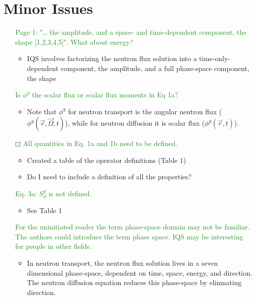 \documentclass{elsarticle}
\newcommand{\working}{$\boxdot$}
\newcommand{\done}{\checkmark}
\newcommand{\easy}[1]{\textcolor{ForestGreen}{#1}}
\begin{document}
\section*{Minor Issues}

\begin{itemize}

\item[\done] \easy{ Page 1: "… the amplitude, and a space- and time-dependent component, the shape [1,2,3,4,5]". What about energy? }
\begin{itemize}
\item IQS involves factorizing the neutron flux solution into a time-only-dependent component, the amplitude, and a full phase-space component, the shape
\end{itemize}

\item[\done] \easy{ Is $\phi^g$ the scalar flux or scalar flux moments in Eq 1a? }
\begin{itemize}
\item Note that $\phi^g$ for neutron transport is the angular neutron flux ($\phi^g(\vec r, \vec\Omega, t)$), while for neutron diffusion it is scalar flux ($\phi^g(\vec r, t)$).
\end{itemize}

\item[\working] \easy{ All quantities in Eq. 1a and 1b need to be defined. }
\begin{itemize}
\item Created a table of the operator definitions (Table 1)
\item Do I need to include a definition of all the properties?
\end{itemize}

\item[\done] \easy{ Eq. 3a: $S_d^g$ is not defined. }
\begin{itemize}
\item See Table 1
\end{itemize}

\item[\done] \easy{ For the uninitiated reader the term phase-space domain may not be familiar. The authors could introduce the term phase space. IQS may be interesting for people in other fields. }
\begin{itemize}
\item In neutron transport, the neutron flux solution lives in a seven dimensional phase-space, dependent on time, space, energy, and direction. The neutron diffusion equation reduces this phase-space by elimnating direction.
\end{itemize}


\end{itemize}
\end{document}
